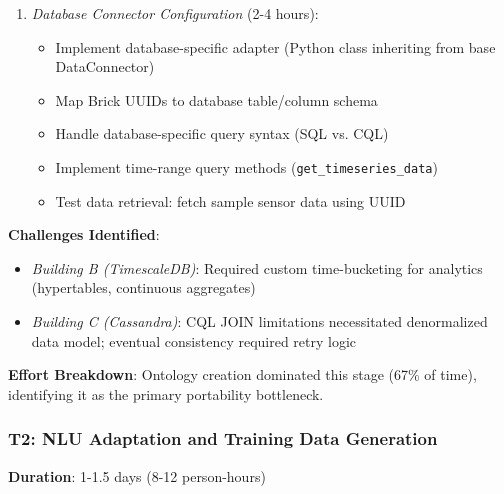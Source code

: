 \documentclass[acmlarge]{acmart}
\begin{document}
\begin{enumerate}
    \item \textit{Database Connector Configuration} (2-4 hours):
    \begin{itemize}
        \item Implement database-specific adapter (Python class inheriting from base DataConnector)
        \item Map Brick UUIDs to database table/column schema
        \item Handle database-specific query syntax (SQL vs. CQL)
        \item Implement time-range query methods (\texttt{get\_timeseries\_data})
        \item Test data retrieval: fetch sample sensor data using UUID
    \end{itemize}
\end{enumerate}

\textbf{Challenges Identified}:
\begin{itemize}
    \item \textit{Building B (TimescaleDB)}: Required custom time-bucketing for analytics (hypertables, continuous aggregates)
    \item \textit{Building C (Cassandra)}: CQL JOIN limitations necessitated denormalized data model; eventual consistency required retry logic
\end{itemize}

\textbf{Effort Breakdown}: Ontology creation dominated this stage (67\% of time), identifying it as the primary portability bottleneck.

\subsubsection{T2: NLU Adaptation and Training Data Generation}

\textbf{Duration}: 1-1.5 days (8-12 person-hours)
\end{document}
